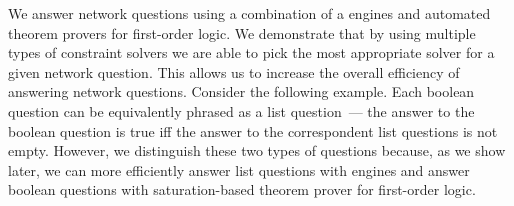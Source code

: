 We answer network questions using a combination of a \Datalog engines and automated theorem provers for first-order logic. We demonstrate that by using multiple types of constraint solvers we are able to pick the most appropriate solver for a given network question. This allows us to increase the overall efficiency of answering network questions. Consider the following example. Each boolean question can be equivalently phrased as a list question~--- the answer to the boolean question is true iff the answer to the correspondent list questions is not empty. However, we distinguish these two types of questions because, as we show later, we can more efficiently answer list questions with \Datalog engines and answer boolean questions with saturation-based theorem prover for first-order logic.


%
%
%


